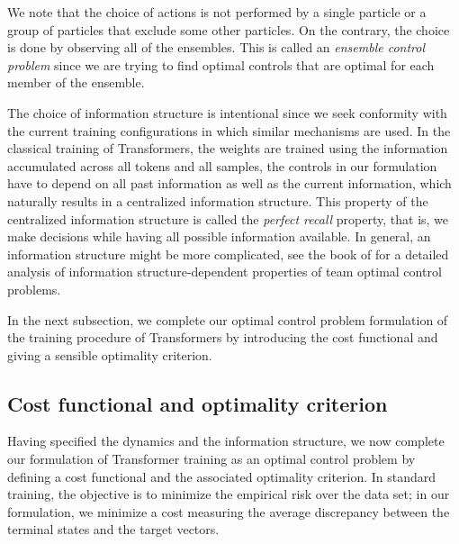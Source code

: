 \documentclass[11pt]{article}
\begin{document}
We note that the choice of actions is not performed by a single particle or a group of particles that exclude some other particles. On the contrary, the choice is done by observing all of the ensembles. This is called an \emph{ensemble control problem} since we are trying to find optimal controls that are optimal for each member of the ensemble. 

The choice of information structure is intentional since we seek conformity with the current training configurations in which similar mechanisms are used. In the classical training of Transformers, the weights are trained using the information accumulated across all tokens and all samples, the controls in our formulation have to depend on all past information as well as the current information, which naturally results in a centralized information structure. This property of the centralized information structure is called the \emph{perfect recall} property, that is, we make decisions while having all possible information available. In general, an information structure might be more complicated, see the book of \cite{yuksel2024stochastic} for a detailed analysis of information structure-dependent properties of team optimal control problems.

In the next subsection, we complete our optimal control problem formulation of the training procedure of Transformers by introducing the cost functional and giving a sensible optimality criterion.

\subsection{Cost functional and optimality criterion}
Having specified the dynamics and the information structure, we now complete our formulation of Transformer training as an optimal control problem by defining a cost functional and the associated optimality criterion. In standard training, the objective is to minimize the empirical risk over the data set; in our formulation, we minimize a cost measuring the average discrepancy between the terminal states and the target vectors.
\end{document}
